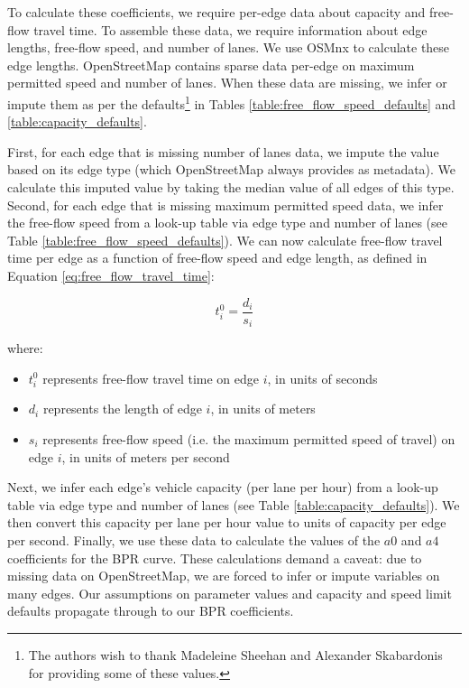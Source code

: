 To calculate these coefficients, we require per-edge data about capacity and free-flow travel time. To assemble these data, we require information about edge lengths, free-flow speed, and number of lanes. We use OSMnx to calculate these edge lengths. OpenStreetMap contains sparse data per-edge on maximum permitted speed and number of lanes. When these data are missing, we infer or impute them as per the defaults\footnote{The authors wish to thank Madeleine Sheehan and Alexander Skabardonis for providing some of these values.} in Tables \ref{table:free_flow_speed_defaults} and \ref{table:capacity_defaults}.

First, for each edge that is missing number of lanes data, we impute the value based on its edge type (which OpenStreetMap always provides as metadata). We calculate this imputed value by taking the median value of all edges of this type. Second, for each edge that is missing maximum permitted speed data, we infer the free-flow speed from a look-up table via edge type and number of lanes (see Table \ref{table:free_flow_speed_defaults}). We can now calculate free-flow travel time per edge as a function of free-flow speed and edge length, as defined in Equation \ref{eq:free_flow_travel_time}:

\begin{equation}
    t^0_i = \frac{d_i}{s_i}
    \label{eq:free_flow_travel_time}
\end{equation}

where:

\begin{itemize}
    \item $t^0_i$ represents free-flow travel time on edge $i$, in units of seconds
    \item $d_i$ represents the length of edge $i$, in units of meters
    \item $s_i$ represents free-flow speed (i.e. the maximum permitted speed of travel) on edge $i$, in units of meters per second
\end{itemize}

Next, we infer each edge's vehicle capacity (per lane per hour) from a look-up table via edge type and number of lanes (see Table \ref{table:capacity_defaults}). We then convert this capacity per lane per hour value to units of capacity per edge per second. Finally, we use these data to calculate the values of the $a0$ and $a4$ coefficients for the BPR curve. These calculations demand a caveat: due to missing data on OpenStreetMap, we are forced to infer or impute variables on many edges. Our assumptions on parameter values and capacity and speed limit defaults propagate through to our BPR coefficients.

